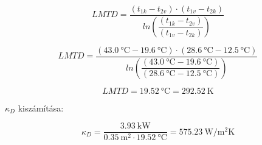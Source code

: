 \begin{equation}
	LMTD = \dfrac{(t_{1k}-t_{2v}) \cdot (t_{1v}-t_{2k})}{ln(\dfrac{(t_{1k}-t_{2v})}{(t_{1v}-t_{2k})})} 
\end{equation}

\begin{equation}
	LMTD = \dfrac{(\SI{43,0}{\celsius}-\SI{19,6}{\celsius}) \cdot (\SI{28,6}{\celsius}-\SI{12,5}{\celsius})}{ln(\dfrac{(\SI{43,0}{\celsius}-\SI{19,6}{\celsius})}{(\SI{28,6}{\celsius}-\SI{12,5}{\celsius})})} 
\end{equation}

\begin{equation}
	LMTD = \SI {19.52}{\celsius} = \SI {292.52}{\kelvin}
\end{equation}


$\kappa_D$ kiszámítása:

\begin{equation}
	\kappa_D = \dfrac {\SI {3.93}{\kilo\watt}}{\SI{0.35}{\meter\squared}\cdot \SI {19.52}{\celsius}} = \SI {575.23}{\watt\per\meter\squared\kelvin}
\end{equation}

\pagebreak

